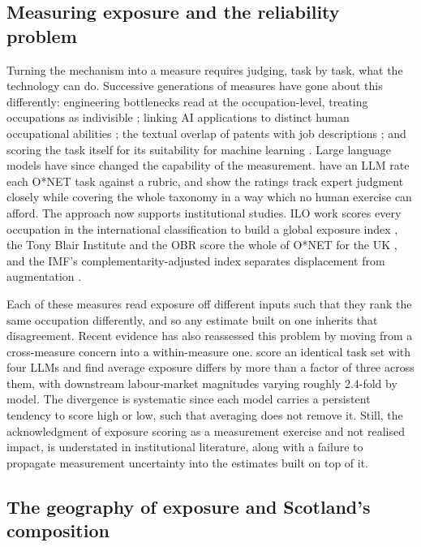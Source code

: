 \subsection*{Measuring exposure and the reliability problem}

Turning the mechanism into a measure requires judging, task by task, what the technology can do. Successive generations of measures have gone about this differently: engineering bottlenecks read at the occupation-level, treating occupations as indivisible \citep{frey2017}; linking AI applications to distinct human occupational abilities \citep{felten2021}; the textual overlap of patents with job descriptions \citep{webb2019}; and scoring the task itself for its suitability for machine learning \citep{brynjolfsson2018}. Large language models have since changed the capability of the measurement. \citet{eloundou2024} have an LLM rate each O*NET task against a rubric, and show the ratings track expert judgment closely while covering the whole taxonomy in a way which no human exercise can afford. The approach now supports institutional studies. ILO work scores every occupation in the international classification to build a global exposure index \citep{gmyrek2023}, the Tony Blair Institute and the OBR score the whole of O*NET for the UK \citep{obr2025, tbi2024}, and the IMF's complementarity-adjusted index separates displacement from augmentation \citep{pizzinelli2023, cazzaniga2024}.

Each of these measures read exposure off different inputs such that they rank the same occupation differently, and so any estimate built on one inherits that disagreement. Recent evidence has also reassessed this problem by moving from a cross-measure concern into a within-measure one. \citet{yin2026} score an identical task set with four LLMs and find average exposure differs by more than a factor of three across them, with downstream labour-market magnitudes varying roughly 2.4-fold by model. The divergence is systematic since each model carries a persistent tendency to score high or low, such that averaging does not remove it. Still, the acknowledgment of exposure scoring as a measurement exercise and not realised impact, is understated in institutional literature, along with a failure to propagate measurement uncertainty into the estimates built on top of it.

\subsection*{The geography of exposure and Scotland's composition}

